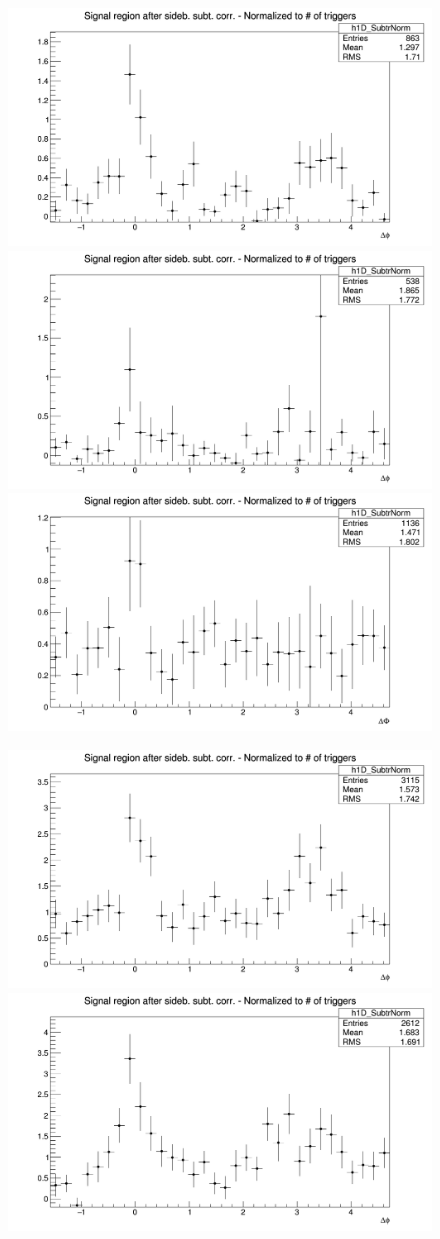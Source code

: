 \begin{figure}[!htbp]
{\includegraphics[width=0.31\linewidth, height=0.23\linewidth]{figures/Dzero/AzimCorrDistr_Dzero_Canvas_PtIntBins12to13_PoolInt_thr2dotto3dot.png}}
{\includegraphics[width=0.31\linewidth, height=0.23\linewidth]{figures/DplusPlotsweff/AzimCorrDistr_Dplus_Canvas_PtIntBins13to13_PoolInt_thr2dotto3dot.png}}
{\includegraphics[width=0.31\linewidth, height=0.23\linewidth]{figures/Dstar_wEFF/AzimCorrDistr_Dstar_Canvas_PtIntBins10to10_PoolInt_thr2dotto3dot.png}}

{\includegraphics[width=0.31\linewidth, height=0.23\linewidth]{figures/Dzero/AzimCorrDistr_Dzero_Canvas_PtIntBins12to13_PoolInt_thr1dotto3dot.png}}
{\includegraphics[width=0.31\linewidth, height=0.23\linewidth]{figures/DplusPlotsweff/AzimCorrDistr_Dplus_Canvas_PtIntBins13to13_PoolInt_thr1dotto3dot.png}}



\end{figure}
